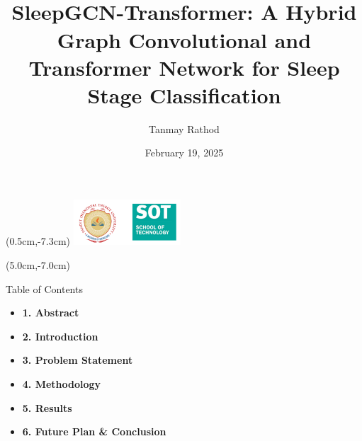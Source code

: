 \documentclass [aspectratio=169]{beamer}
\title[]{\vspace{60pt} \\
SleepGCN-Transformer: A Hybrid Graph Convolutional and Transformer Network for Sleep Stage Classification} %
\author[]{Tanmay Rathod }
\date{February 19, 2025}
\begin{document}
{
\begin{frame}
    \titlepage
    \begin{textblock*}{4cm}(0.5cm,-7.3cm)
        \includegraphics[width=4cm]{figures/pdpu logo-.png}
    \end{textblock*}
    \begin{textblock*}{8cm}(5.0cm,-7.0cm)
        \huge {} %
    \end{textblock*}
\end{frame}
}




\begin{frame}{Table of Contents}

    \begin{block}{}
        \begin{itemize}
            \item \textbf{1. Abstract}
            \item \textbf{2. Introduction}
            \item \textbf{3. Problem Statement}
            \item \textbf{4. Methodology}
            \item \textbf{5. Results}
            \item \textbf{6. Future Plan \& Conclusion}
        \end{itemize}
    \end{block}
\end{frame}


        
 
        
    

 


\end{document}
